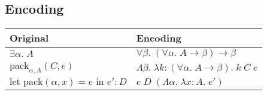 \documentclass[11pt]{article}
\begin{document}
{    \subsection*{Encoding}
    {

        \begin{tabular}{l | l}
        Original & Encoding \\
        \hline
        \(\exists\alpha.\;A\) & \(\forall\beta.\;(\forall\alpha.\;A\rightarrow\beta)\rightarrow\beta\) \\
        \(\text{pack}_{\alpha,A}(C,e)\) & \(\Lambda\beta.\;\lambda k:(\forall\alpha.\;A\rightarrow\beta).\;k\;C\;e\) \\
        \(\text{let pack}(\alpha,x) = e\text{ in }e' : D\) & \(e\;D\;(\Lambda\alpha.\;\lambda x:A.\;e')\) \\
        \end{tabular}
    }
}
\end{document}
